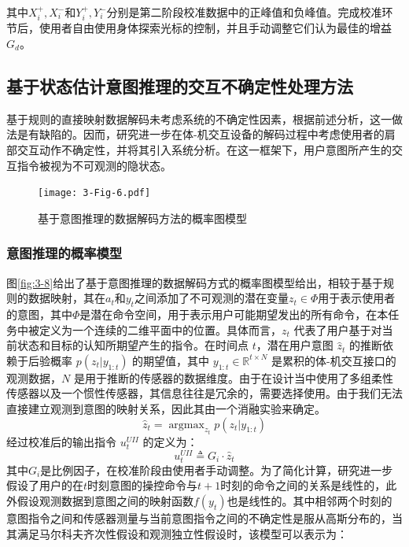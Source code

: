 其中$X_i^ + ,X_i^ - $和$Y_i^ + ,Y_i^ - $分别是第二阶段校准数据中的正峰值和负峰值。完成校准环节后，使用者自由使用身体探索光标的控制，并且手动调整它们认为最佳的增益$G_d$。

\subsection{基于状态估计意图推理的交互不确定性处理方法}基于规则的直接映射数据解码未考虑系统的不确定性因素，根据前述分析，这一做法是有缺陷的。因而，研究进一步在体-机交互设备的解码过程中考虑使用者的肩部交互动作不确定性，并将其引入系统分析。在这一框架下，用户意图所产生的交互指令被视为不可观测的隐状态。

\begin{figure}[htb]
    \centering
    \texttt{[image: 3-Fig-6.pdf]}
    \caption{基于意图推理的数据解码方法的概率图模型}
    \label{fig:3-6}
\end{figure}

\subsubsection{意图推理的概率模型}
图\ref{fig:3-8}给出了基于意图推理的数据解码方式的概率图模型给出，相较于基于规则的数据映射，其在${a_t}$和${y_t}$之间添加了不可观测的潜在变量${z_t} \in \Phi $用于表示使用者的意图，其中$\Phi$是潜在命令空间，用于表示用户可能期望发出的所有命令，在本任务中被定义为一个连续的二维平面中的位置。具体而言，${z_t}$ 代表了用户基于对当前状态和目标的认知所期望产生的指令。在时间点 $t$，潜在用户意图 ${\hat z_t}$ 的推断依赖于后验概率 $p({z_t}|{y_{1:t}})$ 的期望值，其中 $y_{1:t} \in {\mathbb{R}^{t \times N}}$ 是累积的体-机交互接口的观测数据，$N$ 是用于推断的传感器的数据维度。由于在设计当中使用了多组柔性传感器以及一个惯性传感器，其信息往往是冗余的，需要选择使用。由于我们无法直接建立观测到意图的映射关系，因此其由一个消融实验来确定。
\begin{equation}
    \label{eq5}
    \hat z_t = \mathop{argmax}_{z_t} p({z_t}|{y_{1:t}})
\end{equation}
经过校准后的输出指令 $u_t^{UII}$ 的定义为：
\begin{equation}
\label{eq6}
u_t^{UII} \triangleq {G_i} \cdot {\hat z_t}
\end{equation}    
其中$G_i$是比例因子，在校准阶段由使用者手动调整。为了简化计算，研究进一步假设了用户的在$t$时刻意图的操控命令与$t+1$时刻的命令之间的关系是线性的，此外假设观测数据到意图之间的映射函数$f(y_t)$也是线性的。其中相邻两个时刻的意图指令之间和传感器测量与当前意图指令之间的不确定性是服从高斯分布的，当其满足马尔科夫齐次性假设和观测独立性假设时，该模型可以表示为：

